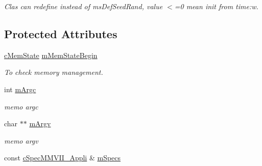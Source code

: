 \begin{DoxyCompactItemize}
\begin{DoxyCompactList}\small\item\em Clas can redefine instead of ms\+Def\+Seed\+Rand, value $<$=0 mean init from time\+:w. \end{DoxyCompactList}\end{DoxyCompactItemize}
\subsection*{Protected Attributes}
\begin{DoxyCompactItemize}
\item 
\hyperlink{classMMVII_1_1cMemState}{c\+Mem\+State} \hyperlink{classMMVII_1_1cMMVII__Appli_a8e8ef4274268a923b6e586ca4d4d8cba}{m\+Mem\+State\+Begin}\hypertarget{classMMVII_1_1cMMVII__Appli_a8e8ef4274268a923b6e586ca4d4d8cba}{}\label{classMMVII_1_1cMMVII__Appli_a8e8ef4274268a923b6e586ca4d4d8cba}

\begin{DoxyCompactList}\small\item\em To check memory management. \end{DoxyCompactList}\item 
int \hyperlink{classMMVII_1_1cMMVII__Appli_a6f5d72aa095f192cb6896076e7854bf2}{m\+Argc}\hypertarget{classMMVII_1_1cMMVII__Appli_a6f5d72aa095f192cb6896076e7854bf2}{}\label{classMMVII_1_1cMMVII__Appli_a6f5d72aa095f192cb6896076e7854bf2}

\begin{DoxyCompactList}\small\item\em memo argc \end{DoxyCompactList}\item 
char $\ast$$\ast$ \hyperlink{classMMVII_1_1cMMVII__Appli_a5dce048e1b8e02d6b27096b9f3ce233e}{m\+Argv}\hypertarget{classMMVII_1_1cMMVII__Appli_a5dce048e1b8e02d6b27096b9f3ce233e}{}\label{classMMVII_1_1cMMVII__Appli_a5dce048e1b8e02d6b27096b9f3ce233e}

\begin{DoxyCompactList}\small\item\em memo argv \end{DoxyCompactList}\item 
const \hyperlink{classMMVII_1_1cSpecMMVII__Appli}{c\+Spec\+M\+M\+V\+I\+I\+\_\+\+Appli} \& \hyperlink{classMMVII_1_1cMMVII__Appli_a84fcf44d51f6db3ecb3cf48fb459d2ed}{m\+Specs}\hypertarget{classMMVII_1_1cMMVII__Appli_a84fcf44d51f6db3ecb3cf48fb459d2ed}{}\label{classMMVII_1_1cMMVII__Appli_a84fcf44d51f6db3ecb3cf48fb459d2ed}


\end{DoxyCompactItemize}
